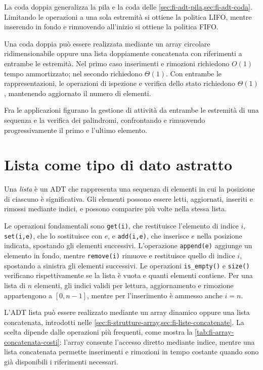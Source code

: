 La coda doppia generalizza la pila e la coda delle
\cref{sec:fi-adt-pila,sec:fi-adt-coda}. Limitando le operazioni
a una sola estremità si ottiene la politica LIFO, mentre
inserendo in fondo e rimuovendo all'inizio si ottiene
la politica FIFO.

Una coda doppia può essere realizzata mediante un array circolare
ridimensionabile oppure una lista doppiamente concatenata con
riferimenti a entrambe le estremità. Nel primo caso inserimenti
e rimozioni richiedono \(O(1)\) tempo ammortizzato; nel secondo
richiedono \(\Theta(1)\). Con entrambe le rappresentazioni,
le operazioni di ispezione e verifica dello stato richiedono
\(\Theta(1)\), mantenendo aggiornato il numero di elementi.

Fra le applicazioni figurano la gestione di attività da entrambe
le estremità di una sequenza e la verifica dei palindromi,
confrontando e rimuovendo progressivamente il primo e
l'ultimo elemento.

\section{Lista come tipo di dato astratto}
\label{sec:fi-adt-lista}

\begin{definition}[Lista]
\label{def:fi-adt-lista}
Una \emph{lista} è un ADT che rappresenta una sequenza di elementi
in cui la posizione di ciascuno è significativa. Gli elementi
possono essere letti, aggiornati, inseriti e rimossi mediante
indici, e possono comparire più volte nella stessa lista.
\end{definition}

Le operazioni fondamentali sono \texttt{get(i)}, che restituisce
l'elemento di indice \(i\), \texttt{set(i,e)}, che lo sostituisce
con \(e\), e \texttt{add(i,e)}, che inserisce \(e\) nella posizione
indicata, spostando gli elementi successivi. L'operazione
\texttt{append(e)} aggiunge un elemento in fondo, mentre
\texttt{remove(i)} rimuove e restituisce quello di indice \(i\),
spostando a sinistra gli elementi successivi.
Le operazioni \texttt{is\_empty()} e \texttt{size()} verificano
rispettivamente se la lista è vuota e quanti elementi contiene.
Per una lista di \(n\) elementi, gli indici validi per lettura,
aggiornamento e rimozione appartengono a \([0,n-1]\), mentre
per l'inserimento è ammesso anche \(i=n\).

L'ADT lista può essere realizzato mediante un array dinamico
oppure una lista concatenata, introdotti nelle
\cref{sec:fi-strutture-array,sec:fi-liste-concatenate}.
La scelta dipende dalle operazioni più frequenti, come mostra
la \cref{tab:fi-array-concatenata-costi}: l'array consente
l'accesso diretto mediante indice, mentre una lista concatenata
permette inserimenti e rimozioni in tempo costante quando
sono già disponibili i riferimenti necessari.

